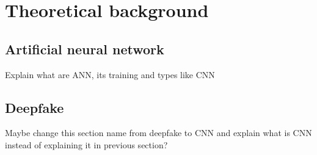 \chapter{Theoretical background}
\section{Artificial neural network}
Explain what are ANN, its training and types like CNN

\section{Deepfake}
Maybe change this section name from deepfake to CNN and explain what is CNN instead of explaining it in previous section?